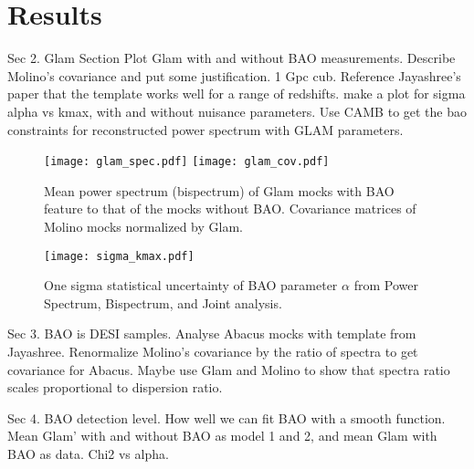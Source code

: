\section{Results}\label{sec:results}

Sec 2. Glam Section
Plot Glam with and without BAO measurements.
Describe Molino's covariance and put some justification. 1 Gpc cub.
Reference Jayashree's paper that the template works well for a range of redshifts. make a plot for sigma alpha vs kmax, with and without nuisance parameters.
Use CAMB to get the bao constraints for reconstructed power spectrum with GLAM parameters.

\begin{figure*}
\centering
\texttt{[image: glam\_spec.pdf]}
\texttt{[image: glam\_cov.pdf]}
\caption{Mean power spectrum (bispectrum) of Glam mocks with BAO feature to that of the  mocks without BAO. Covariance matrices of Molino mocks normalized by Glam.}
\end{figure*}



\begin{figure}
\centering
\texttt{[image: sigma\_kmax.pdf]}
\caption{One sigma statistical uncertainty of BAO parameter $\alpha$ from Power Spectrum, Bispectrum, and Joint analysis.}
\end{figure}

Sec 3. BAO is DESI samples. Analyse Abacus mocks with template from Jayashree. Renormalize Molino's covariance by the ratio of spectra to get covariance for Abacus. Maybe use Glam and Molino to show that spectra ratio scales proportional to dispersion ratio.

Sec 4. BAO detection level. How well we can fit BAO with a smooth function. Mean Glam' with and without BAO as model 1 and 2, and mean Glam with BAO as data. Chi2 vs alpha.
